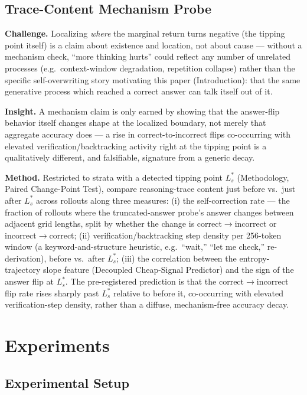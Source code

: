 \documentclass[11pt]{article}
\begin{document}
\subsection{Trace-Content Mechanism Probe}
\textbf{Challenge.} Localizing \emph{where} the marginal return turns negative (the tipping point itself) is a claim about existence and location, not about cause --- without a mechanism check, ``more thinking hurts'' could reflect any number of unrelated processes (e.g.\ context-window degradation, repetition collapse) rather than the specific self-overwriting story motivating this paper (Introduction): that the same generative process which reached a correct answer can talk itself out of it.

\textbf{Insight.} A mechanism claim is only earned by showing that the answer-flip behavior itself changes shape at the localized boundary, not merely that aggregate accuracy does --- a rise in correct-to-incorrect flips co-occurring with elevated verification/backtracking activity right at the tipping point is a qualitatively different, and falsifiable, signature from a generic decay.

\textbf{Method.} Restricted to strata with a detected tipping point $L^*_s$ (Methodology, Paired Change-Point Test), compare reasoning-trace content just before vs.\ just after $L^*_s$ across rollouts along three measures: (i) the self-correction rate --- the fraction of rollouts where the truncated-answer probe's answer changes between adjacent grid lengths, split by whether the change is correct$\to$incorrect or incorrect$\to$correct; (ii) verification/backtracking step density per 256-token window (a keyword-and-structure heuristic, e.g.\ ``wait,'' ``let me check,'' re-derivation), before vs.\ after $L^*_s$; (iii) the correlation between the entropy-trajectory slope feature (Decoupled Cheap-Signal Predictor) and the sign of the answer flip at $L^*_s$. The pre-registered prediction is that the correct$\to$incorrect flip rate rises sharply past $L^*_s$ relative to before it, co-occurring with elevated verification-step density, rather than a diffuse, mechanism-free accuracy decay.

\section{Experiments}

\subsection{Experimental Setup}
\end{document}
